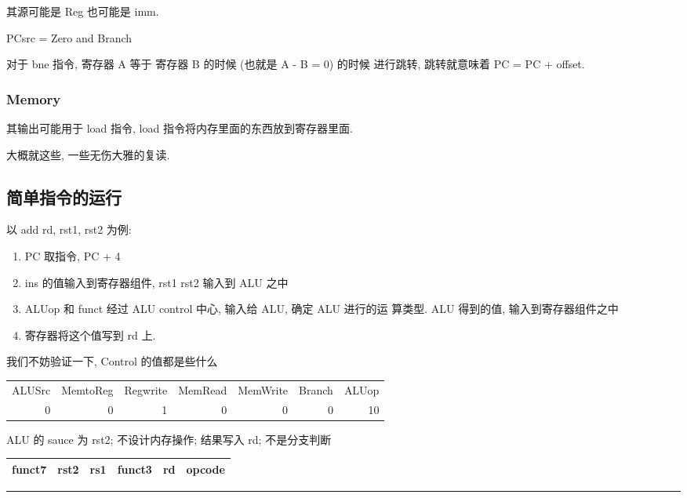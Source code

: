\documentclass[11pt]{ctexart}
\begin{document}
其源可能是 Reg 也可能是 imm. 

PCsrc = Zero and Branch 

对于 bne 指令, 寄存器 A 等于 寄存器 B 的时候 (也就是 A - B = 0) 的时候
进行跳转, 跳转就意味着 PC = PC + offset. 

\subsubsection{Memory}
\label{sec:org9bfd67b}

其输出可能用于 load 指令, load 指令将内存里面的东西放到寄存器里面. 

大概就这些, 一些无伤大雅的复读. 
\subsection{简单指令的运行}
\label{sec:org342a7fe}

以 add rd, rst1, rst2 为例:

\begin{enumerate}
\item PC 取指令, PC + 4
\item ins 的值输入到寄存器组件, rst1 rst2 输入到 ALU 之中
\item ALUop 和 funct 经过 ALU control 中心, 输入给 ALU, 确定 ALU 进行的运
算类型. ALU 得到的值, 输入到寄存器组件之中
\item 寄存器将这个值写到 rd 上.
\end{enumerate}

我们不妨验证一下, Control 的值都是些什么

\begin{center}
\begin{tabular}{rrrrrrr}
ALUSrc & MemtoReg & Regwrite & MemRead & MemWrite & Branch & ALUop\\
0 & 0 & 1 & 0 & 0 & 0 & 10\\
\end{tabular}
\end{center}

ALU 的 sauce 为 rst2; 不设计内存操作; 结果写入 rd; 不是分支判断

\begin{center}
  \begin{tabular}{|l|l|l|l|l|l|} \hline 
funct7 & rst2 & rs1 & funct3 & rd & opcode\\ \hline
\end{tabular}
\end{center}

\noindent\rule{\textwidth}{0.5pt}
\end{document}
